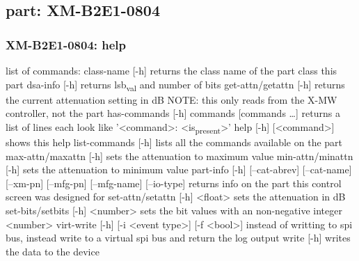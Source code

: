 \documentclass[11pt]{article}
\begin{document}
\subsection{part: XM-B2E1-0804}
\label{sec:org342d15f}
\subsubsection{XM-B2E1-0804: help}
\label{sec:org67aad38}
list of commands:
  class-name [-h]
    returns the class name of the part class this part
  dsa-info [-h]
    returns lsb\textsubscript{val} and number of bits
  get-attn/getattn [-h]
    returns the current attenuation setting in dB
    NOTE: this only reads from the X-MW controller, not the part
  has-commands [-h] commands [commands \ldots{}]
    returns a list of lines each look like '<command>: <is\textsubscript{present}>'
  help [-h] [<command>]
    shows this help
  list-commands [-h]
    lists all the commands available on the part
  max-attn/maxattn [-h]
    sets the attenuation to maximum value
  min-attn/minattn [-h]
    sets the attenuation to minimum value
  part-info  [-h] [--cat-abrev] [--cat-name] [--xm-pn] [--mfg-pn] [--mfg-name]
          [--io-type]
    returns info on the part this control screen was designed for
  set-attn/setattn [-h] <float>
    sets the attenuation in dB
  set-bits/setbits [-h] <number>
    sets the bit values with an non-negative integer <number>
  virt-write [-h] [-i <event type>] [-f <bool>]
    instead of writting to spi bus, instead write to a virtual spi bus
    and return the log output
  write [-h]
    writes the data to the device
\end{document}

